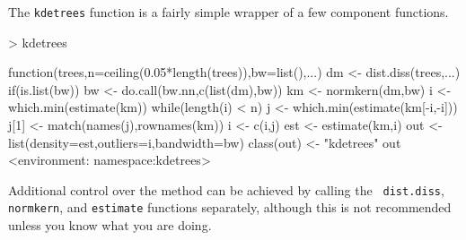 \documentclass{article}
\begin{document}
The {\tt kdetrees} function is a fairly simple wrapper of a few
component functions.
\begin{Schunk}
\begin{Sinput}
> kdetrees
\end{Sinput}
\begin{Soutput}
function(trees,n=ceiling(0.05*length(trees)),bw=list(),...){
  dm <- dist.diss(trees,...)
  if(is.list(bw)) bw <- do.call(bw.nn,c(list(dm),bw))
  km <- normkern(dm,bw)
  i <- which.min(estimate(km))
  while(length(i) < n){
    j <- which.min(estimate(km[-i,-i]))
    j[1] <- match(names(j),rownames(km))
    i <- c(i,j)
  }
  est <- estimate(km,i)
  out <- list(density=est,outliers=i,bandwidth=bw)
  class(out) <- "kdetrees"
  out
}
<environment: namespace:kdetrees>
\end{Soutput}
\end{Schunk}
Additional control over the method can be achieved by calling the {\tt
  dist.diss}, {\tt normkern}, and {\tt estimate} functions separately,
although this is not recommended unless you know what you are doing.
\end{document}
